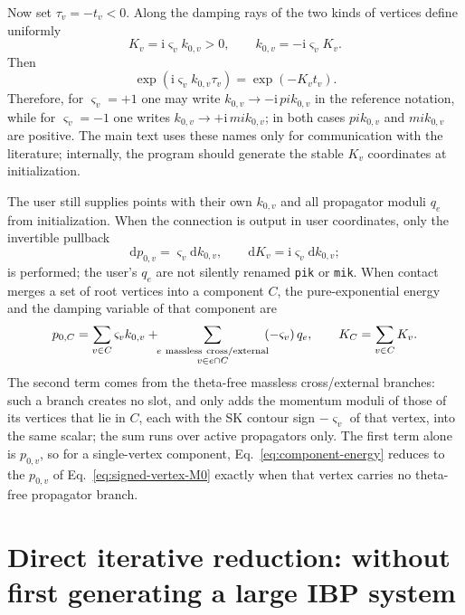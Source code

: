 \documentclass[11pt,a4paper]{article}
\newcommand{\dd}{\mathrm d}
\newcommand{\ii}{\mathrm i}
\begin{document}
Now set $\tau_v=-t_v<0$. Along the damping rays of the two kinds of vertices define uniformly
\begin{equation}
 K_v=\ii\varsigma_vk_{0,v}>0,
 \qquad
 k_{0,v}=-\ii\varsigma_vK_v.
 \label{eq:unified-vertex-wick-coordinate}
\end{equation}
Then
\begin{equation}
 \exp(\ii\varsigma_vk_{0,v}\tau_v)=\exp(-K_vt_v).
\end{equation}
Therefore, for $\varsigma_v=+1$ one may write $k_{0,v}\to-\ii\,pik_{0,v}$ in the reference notation, while for $\varsigma_v=-1$ one writes $k_{0,v}\to+\ii\,mik_{0,v}$; in both cases $pik_{0,v}$ and $mik_{0,v}$ are positive. The main text uses these names only for communication with the literature; internally, the program should generate the stable $K_v$ coordinates at initialization.

The user still supplies points with their own $k_{0,v}$ and all propagator moduli $q_e$ from initialization. When the connection is output in user coordinates, only the invertible pullback
\begin{equation}
 \dd p_{0,v}=\varsigma_v\dd k_{0,v},
 \qquad
 \dd K_v=\ii\varsigma_v\dd k_{0,v};
 \label{eq:user-to-internal-coordinate-pullback}
\end{equation}
is performed; the user's $q_e$ are not silently renamed \texttt{pik} or \texttt{mik}. When contact merges a set of root vertices into a component $C$, the pure-exponential energy and the damping variable of that component are
\begin{equation}
 p_{0,C}
 =\sum_{v\in C}\varsigma_vk_{0,v}
 +\!\!\sum_{\substack{e\ {\rm massless\ cross/external}\\ v\in e\cap C}}\!\!(-\varsigma_v)\,q_e,
 \qquad
 K_C=\sum_{v\in C}K_v.
 \label{eq:component-energy}
\end{equation}
The second term comes from the theta-free massless cross/external branches: such a branch creates no slot, and only adds the momentum moduli of those of its vertices that lie in $C$, each with the SK contour sign $-\varsigma_v$ of that vertex, into the same scalar; the sum runs over active propagators only. The first term alone is $p_{0,v}$, so for a single-vertex component, Eq.~\eqref{eq:component-energy} reduces to the $p_{0,v}$ of Eq.~\eqref{eq:signed-vertex-M0} exactly when that vertex carries no theta-free propagator branch.

\section{Direct iterative reduction: without first generating a large IBP system}
\label{sec:direct-reduction}
\end{document}

